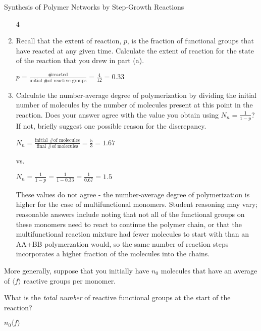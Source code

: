 \begin{activity}[extension]{Synthesis of Polymer Networks by Step-Growth Reactions}
\begin{ctqs}
\begin{enumerate}
				\begin{solution}[0.5in]
					4
				\end{solution}
				
			\item Recall that the extent of reaction, $p$, is the fraction of functional groups that have reacted at any given time.  Calculate the extent of reaction for the state of the reaction that you drew in part (a).
			
				\begin{solution}[1.25in]
					$p = \frac{\text{\# reacted}}{\text{initial \# of reactive groups}} = \frac{4}{12} = 0.33$
				\end{solution}
				
			\item Calculate the number-average degree of polymerization by dividing the initial number of molecules by the number of molecules present at this point in the reaction.  Does your answer agree with the value you obtain using $N_n = \frac{1}{1-p}$?  If not, briefly suggest one possible reason for the discrepancy.
			
				\begin{solution}[2.25in]
					$N_n = \frac{\text{initial \# of molecules}}{\text{final \# of molecules}} = \frac{5}{3} = 1.67$
					
					vs.
					
					$N_n = \frac{1}{1-p} = \frac{1}{1-0.33} = \frac{1}{0.67} = 1.5$
					
					These values do not agree - the number-average degree of polymerization is higher for the case of multifunctional monomers.  Student reasoning may vary; reasonable answers include noting that not all of the functional groups on these monomers need to react to continue the polymer chain, or that the multifunctional reaction mixture had fewer molecules to start with than an AA+BB polymerzation would, so the same number of reaction steps incorporates a higher fraction of the molecules into the chains.
				\end{solution}
		\end{enumerate}

	\question More generally, suppose that you initially have $n_0$ molecules that have an average of $\langle f\rangle$ reactive groups per monomer.  
	
		What is the \emph{total number} of reactive functional groups at the start of the reaction?
	
			\begin{solution}[1in]
				$n_0 \langle f \rangle$
			\end{solution}
			

\end{ctqs}
\end{activity}
